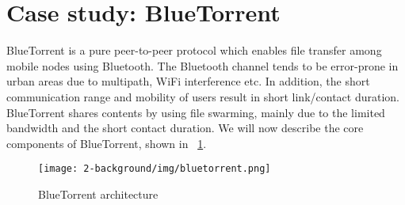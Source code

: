 
\section{Case study: BlueTorrent}
BlueTorrent \cite{bluetorrent} is a pure peer-to-peer protocol which enables file transfer among mobile nodes using Bluetooth. The Bluetooth channel tends to be error-prone in urban areas due to multipath, WiFi interference etc. In addition, the short communication range and mobility of users result in short link/contact duration. BlueTorrent shares contents by using file swarming, mainly due to the limited bandwidth and the short contact duration. We will now describe the core components of BlueTorrent, shown in \figurename~\ref{fig:bluetorrent}.

\begin{figure}[htpb]
  \begin{center}
    \texttt{[image: 2-background/img/bluetorrent.png]}
    \caption{BlueTorrent architecture \cite{bluetorrent}}    
    \label{fig:bluetorrent}
  \end{center}
\end{figure}


